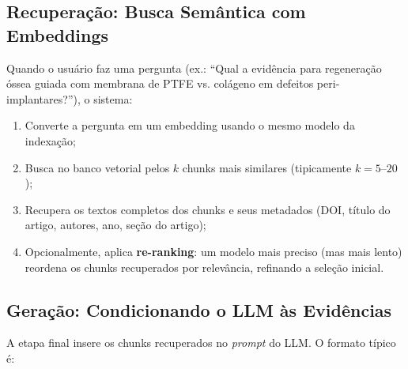 \subsection{Recuperação: Busca Semântica com Embeddings}

Quando o usuário faz uma pergunta (ex.: ``Qual a evidência para regeneração óssea guiada com membrana de PTFE vs. colágeno em defeitos peri-implantares?''), o sistema:

\begin{enumerate}
    \item Converte a pergunta em um embedding usando o mesmo modelo da indexação;
    \item Busca no banco vetorial pelos $k$ chunks mais similares (tipicamente $k = 5$--$20$);
    \item Recupera os textos completos dos chunks e seus metadados (DOI, título do artigo, autores, ano, seção do artigo);
    \item Opcionalmente, aplica \textbf{re-ranking}: um modelo mais preciso (mas mais lento) reordena os chunks recuperados por relevância, refinando a seleção inicial.
\end{enumerate}


\subsection{Geração: Condicionando o LLM às Evidências}

A etapa final insere os chunks recuperados no \textit{prompt} do LLM. O formato típico é:

